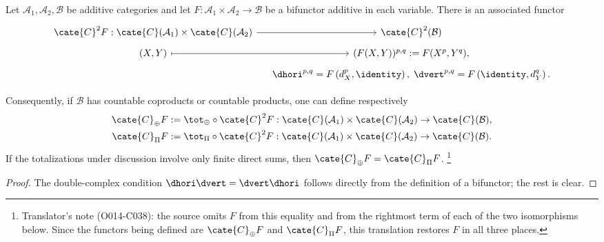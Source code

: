 \begin{definition-proposition}\label{def:bifunctor-cplx}
	Let $\mathcal{A}_1,\mathcal{A}_2,\mathcal{B}$ be additive categories and
	let $F:\mathcal{A}_1\times\mathcal{A}_2\to\mathcal{B}$ be a bifunctor
	additive in each variable. There is an associated functor
	\[\begin{tikzcd}[row sep=tiny, column sep=small]
		\cate{C}^2 F: \cate{C}(\mathcal{A}_1) \times \cate{C}(\mathcal{A}_2) \arrow[r] & \cate{C}^2(\mathcal{B}) \\
		(X, Y) \arrow[mapsto, r] & (F(X, Y))^{p, q} := F(X^p, Y^q), \\
		& \dhori^{p, q} = F\left( d_X^p, \identity \right), \; \dvert^{p, q} = F\left( \identity, d_Y^q\right) .
	\end{tikzcd}\]

	Consequently, if $\mathcal{B}$ has countable coproducts or countable
	products, one can define respectively
	\begin{gather*}
		\cate{C}_{\oplus} F := \tot_{\oplus} \circ \cate{C}^2 F: \cate{C}(\mathcal{A}_1) \times \cate{C}(\mathcal{A}_2) \to \cate{C}(\mathcal{B}), \\
		\cate{C}_{\Pi} F := \tot_{\Pi} \circ \cate{C}^2 F: \cate{C}(\mathcal{A}_1) \times \cate{C}(\mathcal{A}_2) \to \cate{C}(\mathcal{B}).
	\end{gather*}
	If the totalizations under discussion involve only finite direct sums,
	then $\cate{C}_{\oplus}F=\cate{C}_{\Pi}F$.%
	\footnote{Translator's note (O014-C038): the source omits $F$ from this
	equality and from the rightmost term of each of the two isomorphisms below.
	Since the functors being defined are $\cate{C}_{\oplus}F$ and
	$\cate{C}_{\Pi}F$, this translation restores $F$ in all three places.}
\end{definition-proposition}
\begin{proof}
	The double-complex condition $\dhori\dvert=\dvert\dhori$ follows directly
	from the definition of a bifunctor; the rest is clear.
\end{proof}

